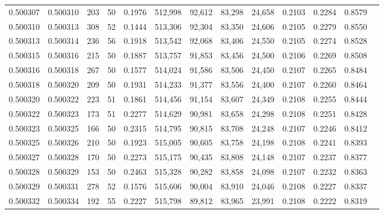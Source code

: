 \begin{tabular}{rrrrrrrrrrrrr}
0.500307 & 0.500310 & 203 &  50 &                                     0.1976 & 512,998 &  92,612 &  83,298 &  24,658 & 0.2103 & 0.2284 & 0.8579 \\
0.500310 & 0.500313 & 308 &  52 &                                     0.1444 & 513,306 &  92,304 &  83,350 &  24,606 & 0.2105 & 0.2279 & 0.8550 \\
0.500313 & 0.500314 & 236 &  56 &                                     0.1918 & 513,542 &  92,068 &  83,406 &  24,550 & 0.2105 & 0.2274 & 0.8528 \\
0.500315 & 0.500316 & 215 &  50 &                                     0.1887 & 513,757 &  91,853 &  83,456 &  24,500 & 0.2106 & 0.2269 & 0.8508 \\
0.500316 & 0.500318 & 267 &  50 &                                     0.1577 & 514,024 &  91,586 &  83,506 &  24,450 & 0.2107 & 0.2265 & 0.8484 \\
0.500318 & 0.500320 & 209 &  50 &                                     0.1931 & 514,233 &  91,377 &  83,556 &  24,400 & 0.2107 & 0.2260 & 0.8464 \\
0.500320 & 0.500322 & 223 &  51 &                                     0.1861 & 514,456 &  91,154 &  83,607 &  24,349 & 0.2108 & 0.2255 & 0.8444 \\
0.500322 & 0.500323 & 173 &  51 &                                     0.2277 & 514,629 &  90,981 &  83,658 &  24,298 & 0.2108 & 0.2251 & 0.8428 \\
0.500323 & 0.500325 & 166 &  50 &                                     0.2315 & 514,795 &  90,815 &  83,708 &  24,248 & 0.2107 & 0.2246 & 0.8412 \\
0.500325 & 0.500326 & 210 &  50 &                                     0.1923 & 515,005 &  90,605 &  83,758 &  24,198 & 0.2108 & 0.2241 & 0.8393 \\
0.500327 & 0.500328 & 170 &  50 &                                     0.2273 & 515,175 &  90,435 &  83,808 &  24,148 & 0.2107 & 0.2237 & 0.8377 \\
0.500328 & 0.500329 & 153 &  50 &                                     0.2463 & 515,328 &  90,282 &  83,858 &  24,098 & 0.2107 & 0.2232 & 0.8363 \\
0.500329 & 0.500331 & 278 &  52 &                                     0.1576 & 515,606 &  90,004 &  83,910 &  24,046 & 0.2108 & 0.2227 & 0.8337 \\
0.500332 & 0.500334 & 192 &  55 &                                     0.2227 & 515,798 &  89,812 &  83,965 &  23,991 & 0.2108 & 0.2222 & 0.8319 \\

\end{tabular}
